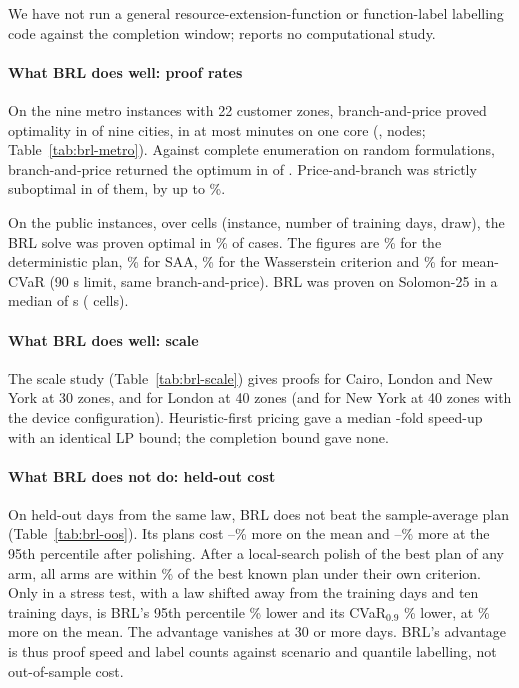 \documentclass[preprint,12pt]{elsarticle}
\theoremstyle{definition}
\theoremstyle{remark}
\begin{document}
We have not run a general resource-extension-function or function-label labelling code \citep{Dabia2013} against the completion window; \citet{Irnich2008} reports no computational study.

\paragraph{What BRL does well: proof rates} On the nine metro instances with 22 customer zones, branch-and-price proved optimality in \BPoptimalN{} of nine cities, in at most \BPtimeMaxMin{} minutes on one core (\BPtimeMaxCity, \BPnodesMax{} nodes; Table~\ref{tab:brl-metro}). Against complete enumeration on \BPverN{} random formulations, branch-and-price returned the optimum in \BPverExact{} of \BPverN. Price-and-branch was strictly suboptimal in \BPverPBsub{} of them, by up to \BPverPBmax\%.

On the public instances, over \BrlProvenCells{} cells (instance, number of training days, draw), the BRL solve was proven optimal in \BrlProvenBrl\% of cases. The figures are \BrlProvenDet\% for the deterministic plan, \BrlProvenSaa\% for SAA, \BrlProvenWass\% for the Wasserstein criterion and \BrlProvenCvar\% for mean-CVaR (90 s limit, same branch-and-price). BRL was proven on Solomon-25 in a median of \BrlSolomonMedian{} s (\BrlSolomonProvenN{} cells).

\paragraph{What BRL does well: scale} The scale study (Table~\ref{tab:brl-scale}) gives proofs for Cairo, London and New York at 30 zones, and for London at 40 zones (and for New York at 40 zones with the device configuration). Heuristic-first pricing gave a median \BrlHeurSpeedup-fold speed-up with an identical LP bound; the completion bound gave none.

\paragraph{What BRL does not do: held-out cost} On held-out days from the same law, BRL does not beat the sample-average plan (Table~\ref{tab:brl-oos}). Its plans cost \BrlOosMeanMin--\BrlOosMeanMax\% more on the mean and \BrlOosPNineFiveMin--\BrlOosPNineFiveMax\% more at the 95th percentile after polishing. After a local-search polish of the best plan of any arm, all arms are within \BrlPolishedAll\% of the best known plan under their own criterion. Only in a stress test, with a law shifted away from the training days and ten training days, is BRL's 95th percentile \BrlShiftTenPNineFive\% lower and its CVaR$_{0.9}$ \BrlShiftTenCvar\% lower, at \BrlShiftTenMean\% more on the mean. The advantage vanishes at 30 or more days. BRL's advantage is thus proof speed and label counts against scenario and quantile labelling, not out-of-sample cost.
\end{document}
